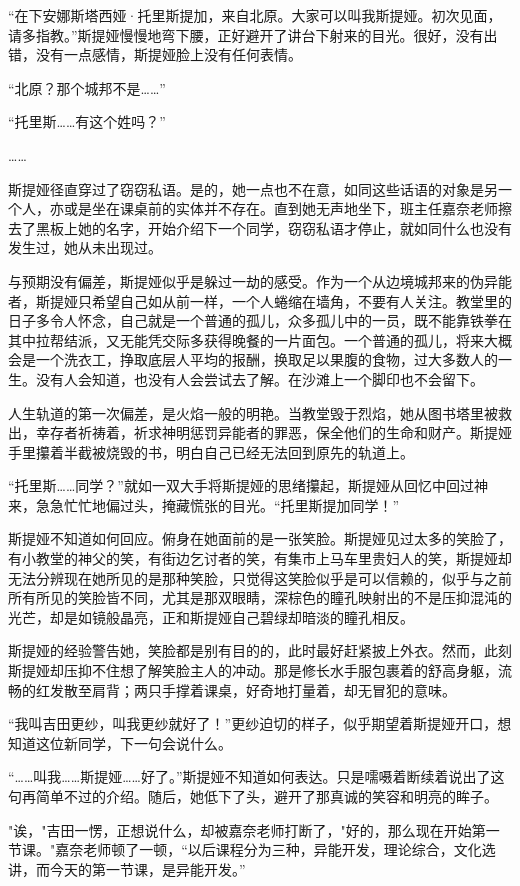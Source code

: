 \documentclass[a5paper, punct=kaiming, fontset=founder]{ctexart}
\begin{document}
“在下安娜斯塔西娅·托里斯提加，来自北原。大家可以叫我斯提娅。初次见面，请多指教。”斯提娅慢慢地弯下腰，正好避开了讲台下射来的目光。很好，没有出错，没有一点感情，斯提娅脸上没有任何表情。

“北原？那个城邦不是……”

“托里斯……有这个姓吗？”

……

斯提娅径直穿过了窃窃私语。是的，她一点也不在意，如同这些话语的对象是另一个人，亦或是坐在课桌前的实体并不存在。直到她无声地坐下，班主任嘉奈老师擦去了黑板上她的名字，开始介绍下一个同学，窃窃私语才停止，就如同什么也没有发生过，她从未出现过。

与预期没有偏差，斯提娅似乎是躲过一劫的感受。作为一个从边境城邦来的伪异能者，斯提娅只希望自己如从前一样，一个人蜷缩在墙角，不要有人关注。教堂里的日子多令人怀念，自己就是一个普通的孤儿，众多孤儿中的一员，既不能靠铁拳在其中拉帮结派，又无能凭交际多获得晚餐的一片面包。一个普通的孤儿，将来大概会是一个洗衣工，挣取底层人平均的报酬，换取足以果腹的食物，过大多数人的一生。没有人会知道，也没有人会尝试去了解。在沙滩上一个脚印也不会留下。

人生轨道的第一次偏差，是火焰一般的明艳。当教堂毁于烈焰，她从图书塔里被救出，幸存者祈祷着，祈求神明惩罚异能者的罪恶，保全他们的生命和财产。斯提娅手里攥着半截被烧毁的书，明白自己已经无法回到原先的轨道上。

“托里斯……同学？”就如一双大手将斯提娅的思绪攥起，斯提娅从回忆中回过神来，急急忙忙地偏过头，掩藏慌张的目光。“托里斯提加同学！”

斯提娅不知道如何回应。俯身在她面前的是一张笑脸。斯提娅见过太多的笑脸了，有小教堂的神父的笑，有街边乞讨者的笑，有集市上马车里贵妇人的笑，斯提娅却无法分辨现在她所见的是那种笑脸，只觉得这笑脸似乎是可以信赖的，似乎与之前所有所见的笑脸皆不同，尤其是那双眼睛，深棕色的瞳孔映射出的不是压抑混沌的光芒，却是如镜般晶亮，正和斯提娅自己碧绿却暗淡的瞳孔相反。

斯提娅的经验警告她，笑脸都是别有目的的，此时最好赶紧披上外衣。然而，此刻斯提娅却压抑不住想了解笑脸主人的冲动。那是修长水手服包裹着的舒高身躯，流畅的红发散至肩背；两只手撑着课桌，好奇地打量着，却无冒犯的意味。

“我叫吉田更纱，叫我更纱就好了！”更纱迫切的样子，似乎期望着斯提娅开口，想知道这位新同学，下一句会说什么。

“……叫我……斯提娅……好了。”斯提娅不知道如何表达。只是嚅嗫着断续着说出了这句再简单不过的介绍。随后，她低下了头，避开了那真诚的笑容和明亮的眸子。

"诶，"吉田一愣，正想说什么，却被嘉奈老师打断了，"好的，那么现在开始第一节课。"嘉奈老师顿了一顿，“以后课程分为三种，异能开发，理论综合，文化选讲，而今天的第一节课，是异能开发。”
\end{document}
